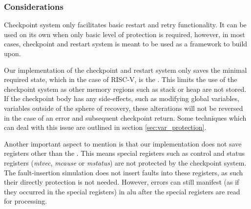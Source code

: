 \subsubsection{Considerations} \label{sec:checkpoint_considerations}

Checkpoint system only facilitates basic restart and retry functionality. It can be used on its own when only basic level of protection is required, however, in most cases, checkpoint and restart system is meant to be used as a framework to build upon.

Our implementation of the checkpoint and restart system only saves the minimal required state, which in the case of RISC-V, is the . This limits the use of the checkpoint system as other memory regions such as stack or heap are not stored. If the checkpoint body has any side-effects, such as modifying global variables, variables outside of the sphere of recovery, these alterations will not be reversed in the case of an error and subsequent checkpoint return. Some techniques which can deal with this issue are outlined in section \ref{sec:var_protection}.

Another important aspect to mention is that our implementation does not save registers other than the . This means special registers such as control and status registers (\textit{mtvec}, \textit{mcause} or \textit{mstatus}) are not protected by the checkpoint system. The fault-insertion simulation does not insert faults into these registers, as such their directly protection is not needed. However, errors can still manifest (as if they occurred in the special registers) in \acrshort{alu} after the special registers are read for processing.
